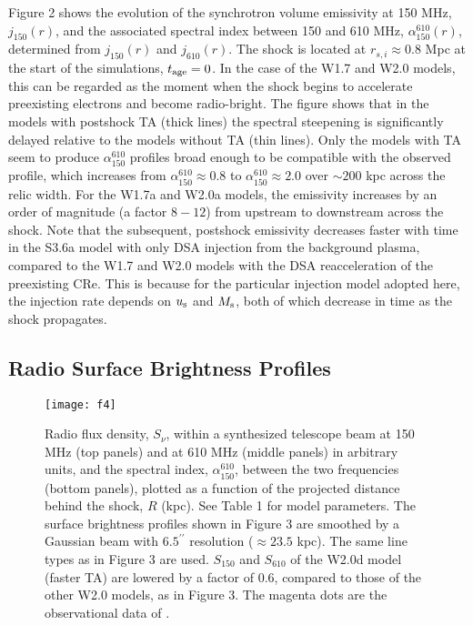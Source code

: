 \documentclass[twocolumn]{aastex61}
\begin{document}
Figure 2 shows the evolution of the synchrotron volume emissivity at 150 MHz, $j_{150}(r)$, 
and the associated spectral index between 150 and 610 MHz, $\alpha_{150}^{610}(r)$, determined from
$j_{150}(r)$ and $j_{610}(r)$.
The shock is located at $r_{s,i}\approx 0.8$ Mpc at the start of the simulations, $t_{\rm age}=0$.
In the case of the W1.7 and W2.0 models, this can be regarded as the moment when the shock begins to accelerate preexisting 
electrons and become radio-bright.
The figure shows that in the models with postshock TA (thick lines) the spectral steepening is significantly delayed
relative to the models without TA (thin lines).
Only the models with TA seem to produce $\alpha_{150}^{610}$ profiles broad enough to be 
compatible with the observed profile, which increases from $\alpha_{150}^{610} \approx 0.8$ to $\alpha_{150}^{610} \approx 2.0$ over $\sim200$ kpc across the relic width.
For the W1.7a and W2.0a models, the emissivity increases by an order of magnitude (a factor $8-12$) from upstream to downstream across the shock.
Note that the subsequent, postshock emissivity decreases faster with time in the S3.6a model 
with only DSA injection from the background plasma,
compared to the W1.7 and W2.0 models with the DSA reacceleration of the preexisting CRe.
This is because for the particular injection model adopted here, 
the injection rate depends on $u_{\rm s}$ and 
$M_{\rm s}$, both of which decrease in time as the shock propagates. 

\subsection{Radio Surface Brightness Profiles}

\begin{figure*}[t]
\vspace{-0.9cm}
\hspace{-0.2cm}
\texttt{[image: f4]}
\vspace{-4.0cm}
\caption{Radio flux density, $S_{\nu}$, within a synthesized telescope beam at 150 MHz (top panels) and at 610 MHz (middle panels)
in arbitrary units, and the
spectral index, $\alpha_{150}^{610}$, between the two frequencies (bottom panels),
plotted as a function of the projected distance behind the shock, $R$ (kpc).
See Table 1 for model parameters.
The surface brightness profiles shown in Figure 3 are smoothed by a
Gaussian beam with $6.5^{\prime\prime}$ resolution ($\approx 23.5$ kpc). 
The same line types as in Figure 3 are used.
$S_{150}$ and $S_{610}$ of the W2.0d model (faster TA) are lowered by a factor of 0.6, compared to those of the other W2.0 models, as in Figure 3.
The magenta dots are the observational data of \citet{vanweeren16}.}
\label{Fig4}
\end{figure*}
\end{document}

